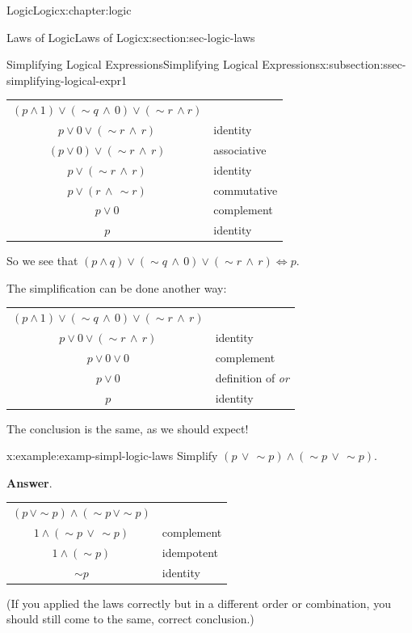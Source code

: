 \documentclass[twoside,10pt,]{book}
\newcommand{\blocktitlefont}{\relax}
\newcommand{\tabularfont}{\relax}
\numberwithin{equation}{section}
\begin{document}
\begin{chapterptx}{Logic}{}{Logic}{}{}{x:chapter:logic}
\begin{sectionptx}{Laws of Logic}{}{Laws of Logic}{}{}{x:section:sec-logic-laws}
\begin{subsectionptx}{Simplifying Logical Expressions}{}{Simplifying Logical Expressions}{}{}{x:subsection:ssec-simplifying-logical-expr1}
\begin{center}
{\begin{tabular}{cc}
\((p{\wedge} 1){\vee}(\sim\!{q}\,{\wedge}\, 0){\vee}(\sim\!{r}\,{\wedge} r)\)&\multicolumn{1}{l}{}\tabularnewline[0pt]
\(p{\vee} 0{\vee}(\sim\!{r}\,{\wedge}\,r)\)&\multicolumn{1}{l}{identity}\tabularnewline[0pt]
\((p{\vee} 0){\vee}(\sim\!{r}\,{\wedge}\,r)\)&\multicolumn{1}{l}{associative}\tabularnewline[0pt]
\(p{\vee}(\sim\!{r}\,{\wedge}\,r)\)&\multicolumn{1}{l}{identity}\tabularnewline[0pt]
\(p{\vee}(r\,{\wedge}\,\sim\!{r})\)&\multicolumn{1}{l}{commutative}\tabularnewline[0pt]
\(p{\vee} 0\)&\multicolumn{1}{l}{complement}\tabularnewline[0pt]
\(p\)&\multicolumn{1}{l}{identity}
\end{tabular}
}%
\end{center}%
 So we see that \((p{\wedge} q){\vee}(\sim\!{q}\,{\wedge}\, 0){\vee}(\sim\!{r}\,{\wedge}\,r)\Leftrightarrow p\).%
\par
The simplification can be done another way: \begin{center}%
{\tabularfont%
\begin{tabular}{cc}
\((p{\wedge} 1){\vee}(\sim\!{q}\,{\wedge} \,0){\vee}(\sim\!{r}\,{\wedge}\,r)\)&\tabularnewline[0pt]
\(p{\vee} 0{\vee}(\sim\!{r}\,{\wedge}\,r)\)&\multicolumn{1}{l}{identity}\tabularnewline[0pt]
\(p{\vee} 0{\vee} 0\)&\multicolumn{1}{l}{complement}\tabularnewline[0pt]
\(p{\vee} 0\)&\multicolumn{1}{l}{definition of \emph{or}}\tabularnewline[0pt]
\(p\)&\multicolumn{1}{l}{identity}
\end{tabular}
}%
\end{center}%
 The conclusion is the same, as we should expect!%
\begin{example}{}{x:example:examp-simpl-logic-laws}%
Simplify \((p\,{\vee}\,\sim\!{p}){\wedge}(\sim\!{p}\,{\vee}\,\sim\!{p})\).\par\smallskip%
\noindent\textbf{\blocktitlefont Answer}.\label{g:answer:idp228611432}{}\hypertarget{g:answer:idp228611432}{}\quad{}\begin{center}%
{\tabularfont%
\begin{tabular}{cc}
\((p\,{\vee}\sim\!{p}){\wedge}(\sim\!{p}\,{\vee}\sim\!{p})\)&\multicolumn{1}{l}{}\tabularnewline[0pt]
\(1{\wedge}(\sim\!{p}\,{\vee}\,\sim\!{p})\)&\multicolumn{1}{l}{complement}\tabularnewline[0pt]
\(1{\wedge}(\sim\!{p})\)&\multicolumn{1}{l}{idempotent}\tabularnewline[0pt]
\(\sim\!{p}\)&\multicolumn{1}{l}{identity}
\end{tabular}
}%
\end{center}%
 (If you applied the laws correctly but in a different order or combination, you should still come to the same, correct conclusion.)\end{example}

\end{subsectionptx}
\end{sectionptx}
\end{chapterptx}
\end{document}
